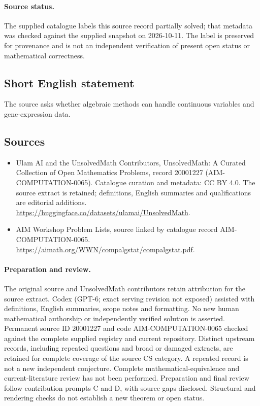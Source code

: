 \documentclass[11pt]{article}
\begin{document}
\paragraph{Source status.}
The supplied catalogue labels this source record partially solved; that metadata was checked against the supplied snapshot on 2026-10-11. The label is preserved for provenance and is not an independent verification of present open status or mathematical correctness.
\subsection{Short English statement}
The source asks whether algebraic methods can handle continuous variables and gene-expression data.
\subsection{Sources}
\begin{itemize}
\item[\hypertarget{source:20001227:1}{S1}] Ulam AI and the UnsolvedMath Contributors, UnsolvedMath: A Curated Collection of Open Mathematics Problems, record 20001227 (AIM-COMPUTATION-0065). Catalogue curation and metadata: CC BY 4.0. The source extract is retained; definitions, English summaries and qualifications are editorial additions.
\url{https://huggingface.co/datasets/ulamai/UnsolvedMath}.
\item[\hypertarget{source:20001227:2}{S2}] AIM Workshop Problem Lists, source linked by catalogue record AIM-COMPUTATION-0065.
\url{https://aimath.org/WWN/compalgstat/compalgstat.pdf}.
\end{itemize}
\paragraph{Preparation and review.}
The original source and UnsolvedMath contributors retain attribution for the source extract. Codex (GPT-6; exact serving revision not exposed) assisted with definitions, English summaries, scope notes and formatting. No new human mathematical authorship or independently verified solution is asserted. Permanent source ID 20001227 and code AIM-COMPUTATION-0065 checked against the complete supplied registry and current repository. Distinct upstream records, including repeated questions and broad or damaged extracts, are retained for complete coverage of the source CS category. A repeated record is not a new independent conjecture. Complete mathematical-equivalence and current-literature review has not been performed. Preparation and final review follow contribution prompts C and D, with source gaps disclosed. Structural and rendering checks do not establish a new theorem or open status.
\label{end:20001227}
\end{document}
